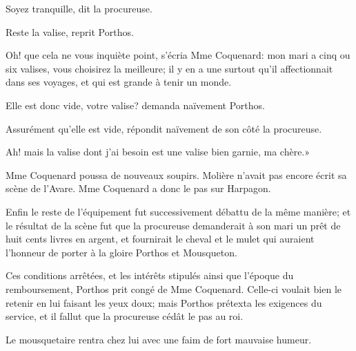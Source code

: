 \speak  Soyez tranquille, dit la procureuse. 

\speak  Reste la valise, reprit Porthos. 

\speak  Oh! que cela ne vous inquiète point, s'écria Mme Coquenard: mon mari a cinq ou six valises, vous choisirez la meilleure; il y en a une surtout qu'il affectionnait dans ses voyages, et qui est grande à tenir un monde. 

\speak  Elle est donc vide, votre valise? demanda naïvement Porthos. 

\speak  Assurément qu'elle est vide, répondit naïvement de son côté la procureuse. 

\speak  Ah! mais la valise dont j'ai besoin est une valise bien garnie, ma chère.» 

Mme Coquenard poussa de nouveaux soupirs. Molière n'avait pas encore écrit sa scène de l'Avare. Mme Coquenard a donc le pas sur Harpagon. 

Enfin le reste de l'équipement fut successivement débattu de la même manière; et le résultat de la scène fut que la procureuse demanderait à son mari un prêt de huit cents livres en argent, et fournirait le cheval et le mulet qui auraient l'honneur de porter à la gloire Porthos et Mousqueton. 

Ces conditions arrêtées, et les intérêts stipulés ainsi que l'époque du remboursement, Porthos prit congé de Mme Coquenard. Celle-ci voulait bien le retenir en lui faisant les yeux doux; mais Porthos prétexta les exigences du service, et il fallut que la procureuse cédât le pas au roi. 

Le mousquetaire rentra chez lui avec une faim de fort mauvaise humeur. 